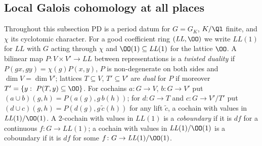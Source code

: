 \subsection{Local Galois cohomology at all places}\label{pf:sh-hodge:bk}

Throughout this subsection $\mathrm{PD}$ is a period datum for $G=G_K$, $K/\Ql$ finite, and $\chi$ its cyclotomic character. For a
good coefficient ring $(\mathit{LL},\OO)$ we write $\mathit{LL}(1)$ for $\mathit{LL}$ with $G$ acting through $\chi$ and $\OO(1)\subseteq
\mathit{LL}(1)$ for the lattice $\OO$. A bilinear map $P\colon V\times V'\to\mathit{LL}$ between representations is a \emph{twisted duality} if
$P(gx,gy)=\chi(g)P(x,y)$, $P$ is non-degenerate on both sides and $\dim V=\dim V'$; lattices $T\subseteq V$, $T'\subseteq V'$ are
\emph{dual} for $P$ if moreover $T'=\{y:\ P(T,y)\subseteq\OO\}$. For cochains $a\colon G\to V$, $b\colon G\to V'$ put $(a\cup b)(g,h)=
P(a(g),g\,b(h))$; for $d\colon G\to T$ and $c\colon G\to V'/T'$ put $(d\cup c)(g,h)=P(d(g),g\,\tilde c(h))$ for any lift $\tilde c$, a
cochain with values in $\mathit{LL}(1)/\OO(1)$. A $2$-cochain with values in $\mathit{LL}(1)$ is a \emph{coboundary} if it is $df$ for a
continuous $f\colon G\to\mathit{LL}(1)$; a cochain with values in $\mathit{LL}(1)/\OO(1)$ is a coboundary if it is $df$ for some
$f\colon G\to\mathit{LL}(1)/\OO(1)$.

